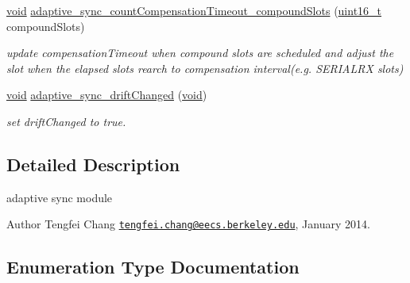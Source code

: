 \begin{DoxyCompactItemize}
\hyperlink{usb__devapi_8h_afabf60e7f57651d6d595a02c75f07cd0}{void} \hyperlink{group__adpativesync_gadfc86247876d1706bb652832d8dd4cc5}{adaptive\+\_\+sync\+\_\+count\+Compensation\+Timeout\+\_\+compound\+Slots} (\hyperlink{_p_e___types_8h_a1f1825b69244eb3ad2c7165ddc99c956}{uint16\+\_\+t} compound\+Slots)
\begin{DoxyCompactList}\small\item\em update compensation\+Timeout when compound slots are scheduled and adjust the slot when the elapsed slots rearch to compensation interval(e.\+g. S\+E\+R\+I\+A\+L\+RX slots) \end{DoxyCompactList}\item 
\hyperlink{usb__devapi_8h_afabf60e7f57651d6d595a02c75f07cd0}{void} \hyperlink{group__adpativesync_gacdd4e97ea162473881017916cb373f47}{adaptive\+\_\+sync\+\_\+drift\+Changed} (\hyperlink{usb__devapi_8h_afabf60e7f57651d6d595a02c75f07cd0}{void})
\begin{DoxyCompactList}\small\item\em set drift\+Changed to true. \end{DoxyCompactList}\end{DoxyCompactItemize}


\subsection{Detailed Description}
adaptive sync module 

\begin{DoxyAuthor}{Author}
Tengfei Chang \href{mailto:tengfei.chang@eecs.berkeley.edu}{\tt tengfei.\+chang@eecs.\+berkeley.\+edu}, January 2014. 
\end{DoxyAuthor}


\subsection{Enumeration Type Documentation}

